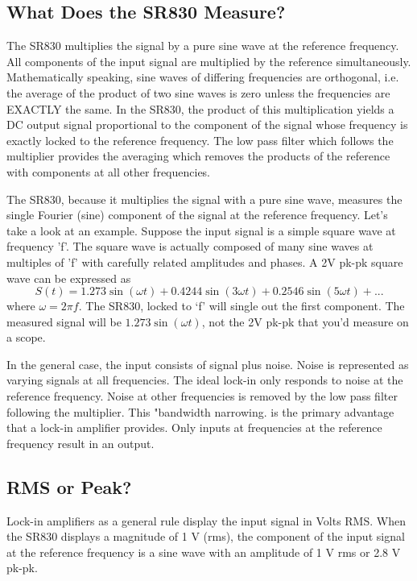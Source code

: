 \documentclass{../lab}
\begin{document}
\subsection{What Does the SR830 Measure?}

The SR830 multiplies the signal by a pure sine wave at the reference frequency. All components of the input signal are multiplied by the reference simultaneously. Mathematically speaking, sine waves of differing frequencies are orthogonal, i.e. the average of the product of two sine waves is zero unless the frequencies are EXACTLY the same. In the SR830, the product of this multiplication yields a DC output signal proportional to the component of the signal whose frequency is exactly locked to the reference frequency. The low pass filter which follows the multiplier provides the averaging which removes the products of the reference with components at all other frequencies.

The SR830, because it multiplies the signal with a pure sine wave, measures the single Fourier (sine) component of the signal at the reference frequency. Let's take a look at an example. Suppose the input signal is a simple square wave at frequency 'f'. The square wave is actually composed of many sine waves at multiples of 'f' with carefully related amplitudes and phases. A 2V pk-pk square wave can be expressed as
\[
    S(t) = 1.273 \sin(\omega t) + 0.4244 \sin(3 \omega t) + 0.2546 \sin(5 \omega t) + ...
\]
where $\omega = 2 \pi f$. The SR830, locked to `f' will single out the first component. The measured signal will be $1.273 \sin(\omega t)$, not the 2V pk-pk that you'd measure on a scope.

In the general case, the input consists of signal plus noise. Noise is represented as varying signals at all frequencies. The ideal lock-in only responds to noise at the reference frequency. Noise at other frequencies is removed by the low pass filter following the multiplier. This "bandwidth narrowing. is the primary advantage that a lock-in amplifier provides. Only inputs at frequencies at the reference frequency result in an output.

\subsection{RMS or Peak?}

Lock-in amplifiers as a general rule display the input signal in Volts RMS. When the SR830 displays a magnitude of 1 V (rms), the component of the input signal at the reference frequency is a sine wave with an amplitude of 1 V rms or 2.8 V pk-pk.
\end{document}
